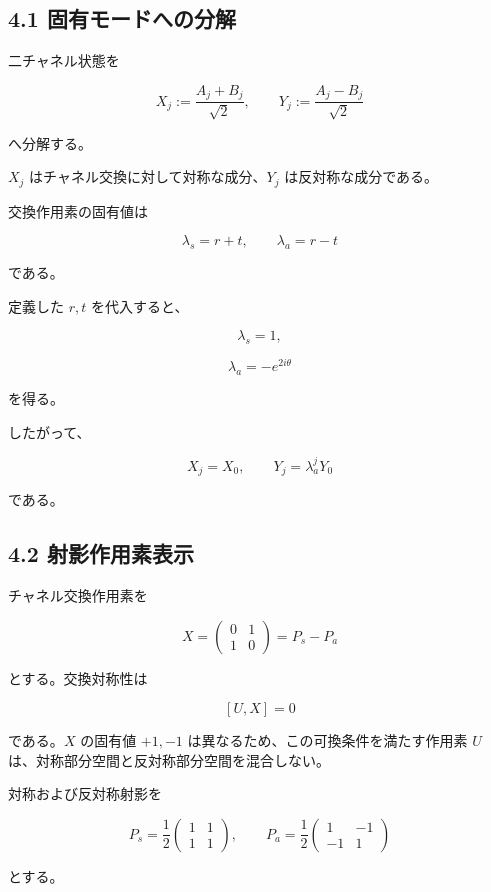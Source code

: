 \documentclass[
  a4paper,
  10pt]{article}
\begin{document}
\subsection{4.1
固有モードへの分解}\label{41-ux56faux6709ux30e2ux30fcux30c9ux3078ux306eux5206ux89e3}

二チャネル状態を

\[
X_j:=\frac{A_j+B_j}{\sqrt2},
\qquad
Y_j:=\frac{A_j-B_j}{\sqrt2}
\]

へ分解する。

\(X_j\) はチャネル交換に対して対称な成分、\(Y_j\) は反対称な成分である。

交換作用素の固有値は

\[
\lambda_s=r+t,
\qquad
\lambda_a=r-t
\]

である。

定義した \(r,t\) を代入すると、

\[
\lambda_s=1,
\]

\[
\lambda_a=-e^{2i\theta}
\]

を得る。

したがって、

\[
X_j=X_0,
\qquad
Y_j=\lambda_a^jY_0
\]

である。

\subsection{4.2
射影作用素表示}\label{42-ux5c04ux5f71ux4f5cux7528ux7d20ux8868ux793a}

チャネル交換作用素を

\[
X=
\begin{pmatrix}
0&1\\
1&0
\end{pmatrix}
=P_s-P_a
\]

とする。交換対称性は

\[
[U,X]=0
\]

である。\(X\) の固有値 \(+1,-1\)
は異なるため、この可換条件を満たす作用素 \(U\)
は、対称部分空間と反対称部分空間を混合しない。

対称および反対称射影を

\[
P_s=
\frac12
\begin{pmatrix}
1&1\\
1&1
\end{pmatrix},
\qquad
P_a=
\frac12
\begin{pmatrix}
1&-1\\
-1&1
\end{pmatrix}
\]

とする。
\end{document}
